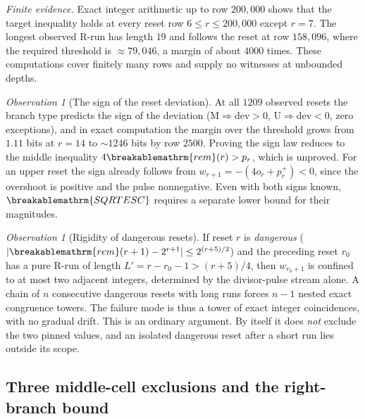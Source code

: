 \documentclass[11pt]{article}
\theoremstyle{plain}
\theoremstyle{definition}
\theoremstyle{remark}
\newtheorem{obs}[thm]{Observation}
\renewcommand{\mathrm}[1]{\ifmmode\breakablemathrm{#1}\else\textrm{#1}\fi}%
\begin{document}
\emph{Finite evidence.} Exact integer arithmetic up to row $200{,}000$ shows that the
target inequality holds at every reset row $6\le r\le200{,}000$ except $r=7$. The longest observed R-run has length $19$ and follows
the reset at row $158{,}096$, where the required threshold is $\approx79{,}046$, a margin of about
$4000$ times.  These computations cover finitely many rows and supply no witnesses at unbounded depths.

\begin{obs}[The sign of the reset deviation]
At all $1209$ observed resets the branch type predicts the sign of the deviation
(M$\Rightarrow$dev$>0$, U$\Rightarrow$dev$<0$, zero exceptions), and in exact computation the margin over the threshold
grows from $1.11$ bits at $r=14$ to $\sim1246$ bits by row $2500$. Proving the sign
law reduces to the middle inequality
$4\mathrm{rem}(r)>p_r$, which is unproved.  For an upper reset the sign already follows
from $w_{r+1}=-(4o_r+p_r^+)<0$, since the overshoot is positive and the
pulse nonnegative.
Even with both signs known, $\mathrm{SQRTESC}$ requires a separate lower bound for their
magnitudes.
\end{obs}

\begin{obs}[Rigidity of dangerous resets]
\label{obs:dangerous-reset-rigidity}
If reset $r$ is \emph{dangerous} ($|\mathrm{rem}(r+1)-2^{r+1}|\le2^{(r+5)/2}$) and the preceding
reset $r_0$ has a pure R-run of length $L'=r-r_0-1>(r+5)/4$, then $w_{r_0+1}$ is confined to at
most two adjacent integers, determined by the divisor-pulse stream alone. A chain of $n$
consecutive dangerous resets with long runs forces $n-1$ nested exact congruence towers. The
failure mode is thus a tower of exact integer coincidences, with no gradual drift. This is an ordinary
argument. By itself it does \emph{not} exclude the two pinned values, and an isolated dangerous reset after a
short run lies outside its scope.
\end{obs}

\subsection{Three middle-cell exclusions and the right-branch bound}
\end{document}

